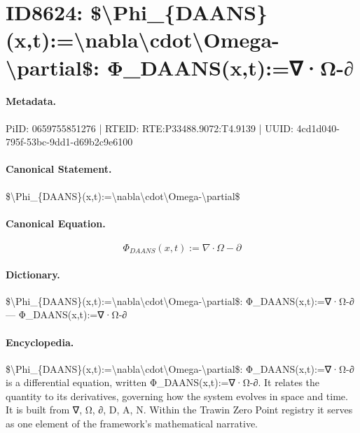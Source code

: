 \section*{ID8624: \$\textbackslash{}Phi\_\{DAANS\}(x,t):=\textbackslash{}nabla\textbackslash{}cdot\textbackslash{}Omega-\textbackslash{}partial\$: Φ\_DAANS(x,t):=∇·Ω-∂}
\paragraph{Metadata.}
PiID: 0659755851276 | RTEID: RTE:P33488.9072:T4.9139 | UUID: 4cd1d040-795f-53bc-9dd1-d69b2c9e6100

\paragraph{Canonical Statement.}
\$\textbackslash{}Phi\_\{DAANS\}(x,t):=\textbackslash{}nabla\textbackslash{}cdot\textbackslash{}Omega-\textbackslash{}partial\$

\paragraph{Canonical Equation.}
\[
\Phi_{DAANS}(x,t):=\nabla\cdot\Omega-\partial
\]

\paragraph{Dictionary.}
\$\textbackslash{}Phi\_\{DAANS\}(x,t):=\textbackslash{}nabla\textbackslash{}cdot\textbackslash{}Omega-\textbackslash{}partial\$: Φ\_DAANS(x,t):=∇·Ω-∂ — Φ\_DAANS(x,t):=∇·Ω-∂

\paragraph{Encyclopedia.}
\$\textbackslash{}Phi\_\{DAANS\}(x,t):=\textbackslash{}nabla\textbackslash{}cdot\textbackslash{}Omega-\textbackslash{}partial\$: Φ\_DAANS(x,t):=∇·Ω-∂ is a differential equation, written Φ\_DAANS(x,t):=∇·Ω-∂. It relates the quantity to its derivatives, governing how the system evolves in space and time. It is built from ∇, Ω, ∂, D, A, N. Within the Trawin Zero Point registry it serves as one element of the framework's mathematical narrative.
